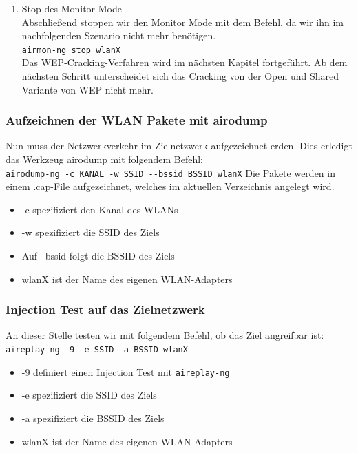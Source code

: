 \begin{enumerate}
		\item Stop des Monitor Mode \\
		 Abschließend stoppen wir den Monitor Mode mit dem Befehl, da wir ihn im nachfolgenden Szenario nicht mehr benötigen. \\
		 \colorbox{altgray}{\lstinline|airmon-ng stop wlanX|} \\
		 Das WEP-Cracking-Verfahren wird im nächsten Kapitel fortgeführt. Ab dem nächsten Schritt unterscheidet sich das Cracking von der Open und Shared Variante von WEP nicht mehr.

	\end{enumerate}

	\subsubsection{Aufzeichnen der WLAN Pakete mit airodump}
	Nun muss der Netzwerkverkehr im Zielnetzwerk aufgezeichnet erden. Dies erledigt das
	Werkzeug airodump mit folgendem Befehl: \\
	\colorbox{altgray}{\lstinline|airodump-ng -c KANAL -w SSID --bssid BSSID wlanX|}
	Die Pakete werden in einem .cap-File aufgezeichnet, welches im aktuellen Verzeichnis angelegt wird.
	\begin{itemize}
		\item -c spezifiziert den Kanal des WLANs
		\item -w spezifiziert die SSID des Ziels
		\item Auf --bssid folgt die BSSID des Ziels
		\item wlanX ist der Name des eigenen WLAN-Adapters
	\end{itemize}
	\subsubsection{Injection Test auf das Zielnetzwerk}
	An dieser Stelle testen wir mit folgendem Befehl, ob das Ziel angreifbar ist: \colorbox{altgray}{\lstinline|aireplay-ng -9 -e SSID -a BSSID wlanX|}
		\begin{itemize}
			\item -9 definiert einen Injection Test mit \colorbox{altgray}{\lstinline|aireplay-ng|}
			\item -e spezifiziert die SSID des Ziels
			\item -a spezifiziert die BSSID des Ziels
			\item wlanX ist der Name des eigenen WLAN-Adapters
		\end{itemize}

